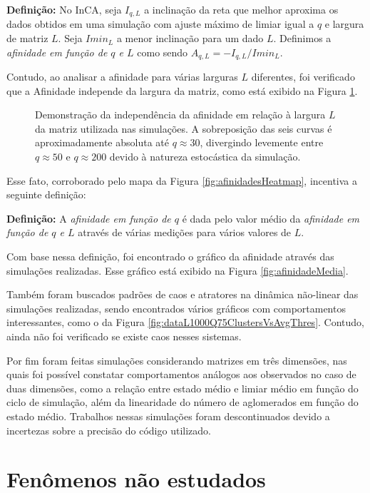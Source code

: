 \documentclass[
	12pt,				%
	openright,			%
	twoside,			%
	a4paper,			%
	english,			%
	french,				%
	spanish,			%
	brazil				%
	]{abntex2}
\begin{document}
\textbf{Definição:} No InCA, seja $I_{q,L}$ a inclinação da reta que melhor aproxima os dados obtidos em uma simulação com ajuste máximo de limiar igual a $q$ e largura de matriz $L$. Seja $Imin_L$ a menor inclinação para um dado $L$. Definimos a \textit{afinidade em função de $q$ e $L$} como sendo $A_{q,L}=-I_{q,L}/Imin_L$.

Contudo, ao analisar a afinidade para várias larguras $L$ diferentes, foi verificado que a Afinidade independe da largura da matriz, como está exibido na Figura \ref{fig:afinidadesQ0a200L750a2000}.
\begin{figure}
    \centering
    \caption{Demonstração da independência da afinidade em relação à largura $L$ da matriz utilizada nas simulações. A sobreposição das seis curvas é aproximadamente absoluta até $q\approx 30$, divergindo levemente entre $q\approx 50$ e $q\approx 200$ devido à natureza estocástica da simulação.}
    \label{fig:afinidadesQ0a200L750a2000}
\end{figure}
Esse fato, corroborado pelo mapa da Figura \ref{fig:afinidadesHeatmap},
incentiva a seguinte definição:

\textbf{Definição:} A \textit{afinidade em função de $q$} é dada pelo valor médio da \textit{afinidade em função de $q$ e $L$} através de várias medições para vários valores de $L$.

Com base nessa definição, foi encontrado o gráfico da afinidade através das simulações realizadas. Esse gráfico está exibido na Figura \ref{fig:afinidadeMedia}.

Também foram buscados padrões de caos e atratores na dinâmica não-linear das simulações realizadas, sendo encontrados vários gráficos com comportamentos interessantes, como o da Figura \ref{fig:dataL1000Q75ClustersVsAvgThres}. Contudo, ainda não foi verificado se existe caos nesses sistemas.

Por fim foram feitas simulações considerando matrizes em três dimensões, nas quais foi possível constatar comportamentos análogos aos observados no caso de duas dimensões, como a relação entre estado médio e limiar médio em função do ciclo de simulação, além da linearidade do número de aglomerados em função do estado médio. Trabalhos nessas simulações foram descontinuados devido a incertezas sobre a precisão do código utilizado.

\section{Fenômenos não estudados}
\end{document}
